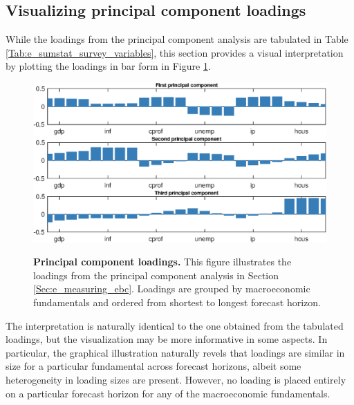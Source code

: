 \documentclass[12pt,a4paper,onecolumn,oneside,notitlepage]{article}
\begin{document}
\begin{appendices}

\clearpage
\section{Visualizing principal component loadings}\label{sec:visualizing_principal_component_loaings}
While the loadings from the principal component analysis are tabulated in Table \ref{Tab:e_sumstat_survey_variables}, this section provides a visual interpretation by plotting the loadings in bar form in Figure \ref{Fig:e_pca_loadings}.
\begin{figure}[htbp]
    \caption{
        \textbf{Principal component loadings.} \newline
        This figure illustrates the loadings from the principal component analysis in Section \ref{Sec:e_measuring_ebc}. Loadings are grouped by macroeconomic fundamentals and ordered from shortest to longest forecast horizon. 
    }
    \centering
    \includegraphics[scale=0.8]{Figures/e_pca_loadings.eps}
    \label{Fig:e_pca_loadings}
\end{figure}
The interpretation is naturally identical to the one obtained from the tabulated loadings, but the visualization may be more informative in some aspects. In particular, the graphical illustration naturally revels that loadings are similar in size for a particular fundamental across forecast horizons, albeit some heterogeneity in loading sizes are present. However, no loading is placed entirely on a particular forecast horizon for any of the macroeconomic fundamentals. 


\end{appendices}
\end{document}
